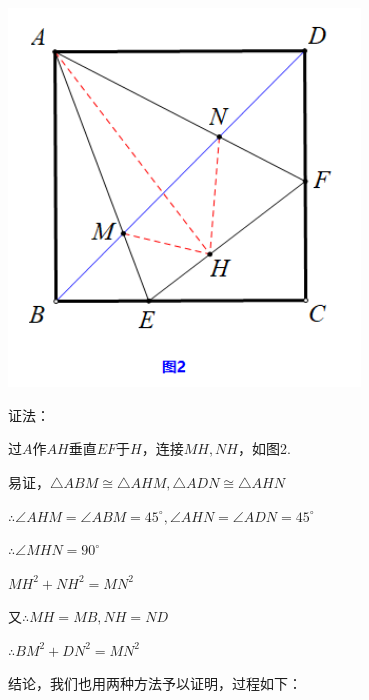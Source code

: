 {\begin{minipage}[h]{0.4\textwidth}
	\centering
	\includegraphics[width=0.7\textwidth]{figure/banjiao13}
\end{minipage}
\quad
\begin{minipage}[h]{0.6\textwidth}

证法：

过$A$作$AH$垂直$EF$于$H$，连接$MH,NH$，如图2.

易证，$\triangle ABM \cong \triangle AHM ,\triangle ADN \cong \triangle AHN$

$\therefore \angle AHM=\angle ABM=45^\circ,\angle AHN=\angle ADN=45^\circ$

$\therefore \angle MHN=90^\circ$

$MH^2+NH^2=MN^2$

又$\therefore MH=MB,NH=ND$

$\therefore BM^2+DN^2=MN^2$
\end{minipage}
}

结论，我们也用两种方法予以证明，过程如下：

